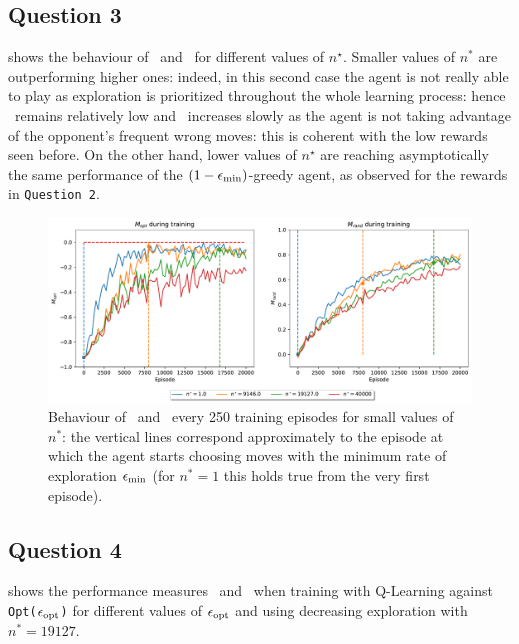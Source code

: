 \documentclass[10pt]{IEEEtran}
\begin{document}
\subsection*{Question 3}
 shows the behaviour of \mopt\ and \mrand\ for different values of $n^{\star}$. Smaller values of $n^{*}$ are outperforming higher ones: indeed, in this second case the agent is not really able to play as exploration is prioritized throughout the whole learning process: hence \mopt\ remains relatively low and \mrand\ increases slowly as the agent is not taking advantage of the opponent's frequent wrong moves: this is coherent with the low rewards seen before. On the other hand, lower values of $n^{\star}$ are reaching asymptotically the same performance of the $(1-\epsilon_{\text{min}})$-greedy agent, as observed for the rewards in \texttt{Question 2}.

\begin{figure}[h]
    \centering
    \includegraphics[width=\linewidth]{code/figures/performance_n_star.pdf}
    \caption{Behaviour of \mopt\  and \mrand\  every 250 training episodes for small values of $n^{*}$:  the vertical lines correspond approximately to the episode at which the agent starts choosing moves with the minimum rate of exploration $\epsilon_{\text{min}}$ (for $n^{*} = 1$ this holds true from the very first episode).}
    \label{plot_question3}
\end{figure}


\subsection*{Question 4}
 shows the performance measures \mopt\  and \mrand\  when training with Q-Learning against \texttt{Opt($\epsilon_{\text{opt}}$)} for different values of $\epsilon_{\text{opt}}$ and using decreasing exploration with $n^{*} = 19127$.
\end{document}
